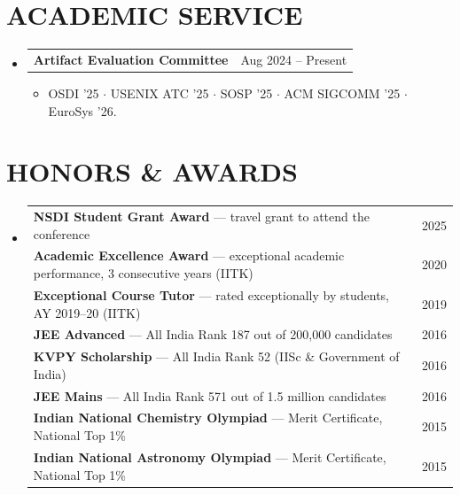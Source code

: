 \documentclass[letterpaper,11pt]{article}
\newcommand{\resumeItem}[1]{
  \item\small{
    {#1 \vspace{-1pt}}
  }
}
\newcommand{\resumeSubHeadingListStart}{\begin{itemize}[leftmargin=0in, label={}]}
\newcommand{\resumeSubHeadingListEnd}{\end{itemize}}
\newcommand{\resumeItemListStart}{\begin{itemize}[leftmargin=0.15in]}
\newcommand{\resumeItemListEnd}{\end{itemize}\vspace{0pt}}
\begin{document}
\section{ACADEMIC SERVICE}
  \resumeSubHeadingListStart
    \item
    \begin{tabular*}{\textwidth}{l@{\extracolsep{\fill}}r}
      \textbf{Artifact Evaluation Committee} & {\color{dark-grey}\small Aug 2024 -- Present} \\
    \end{tabular*}\vspace{-4pt}
    \resumeItemListStart
      \resumeItem{OSDI '25 \hspace{2pt}$\cdot$\hspace{2pt} USENIX ATC '25 \hspace{2pt}$\cdot$\hspace{2pt} SOSP '25 \hspace{2pt}$\cdot$\hspace{2pt} ACM SIGCOMM '25 \hspace{2pt}$\cdot$\hspace{2pt} EuroSys '26.}
    \resumeItemListEnd
  \resumeSubHeadingListEnd

\section{HONORS \& AWARDS}
  \resumeSubHeadingListStart
    \item
    \begin{tabular*}{\textwidth}{l@{\extracolsep{\fill}}r}
      \small \textbf{NSDI Student Grant Award} --- travel grant to attend the conference & {\color{dark-grey}\small 2025} \\[2pt]
      \small \textbf{Academic Excellence Award} --- exceptional academic performance, 3 consecutive years (IITK) & {\color{dark-grey}\small 2020} \\[2pt]
      \small \textbf{Exceptional Course Tutor} --- rated exceptionally by students, AY 2019--20 (IITK) & {\color{dark-grey}\small 2019} \\[2pt]
      \small \textbf{JEE Advanced} --- All India Rank 187 out of 200,000 candidates & {\color{dark-grey}\small 2016} \\[2pt]
      \small \textbf{KVPY Scholarship} --- All India Rank 52 (IISc \& Government of India) & {\color{dark-grey}\small 2016} \\[2pt]
      \small \textbf{JEE Mains} --- All India Rank 571 out of 1.5 million candidates & {\color{dark-grey}\small 2016} \\[2pt]
      \small \textbf{Indian National Chemistry Olympiad} --- Merit Certificate, National Top 1\% & {\color{dark-grey}\small 2015} \\[2pt]
      \small \textbf{Indian National Astronomy Olympiad} --- Merit Certificate, National Top 1\% & {\color{dark-grey}\small 2015} \\[2pt]
    \end{tabular*}
  \resumeSubHeadingListEnd

\end{document}
